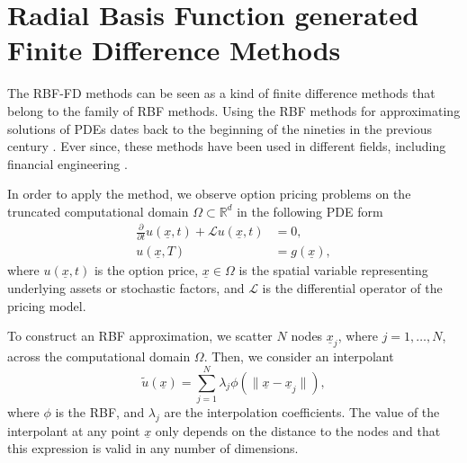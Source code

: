 \documentclass{UUThesisTemplate}
\begin{document}
\chapter{Radial Basis Function generated Finite Difference Methods}
\label{ch:rbffd}
\par The RBF-FD methods can be seen as a kind of finite difference methods that belong to the family of RBF methods. Using the RBF methods for approximating solutions of PDEs dates back to the beginning of the nineties in the previous century \cite{kansa1990multiquadrics2, kansa1990multiquadrics1}. Ever since, these methods have been used in different fields, including financial engineering \cite{pettersson2008improved, fasshauer2004using, hon1999radial}. 
\par In order to apply the method, we observe option pricing problems on the truncated computational domain $\Omega\subset \mathbb{R}^{d}$ in the following PDE form
\begin{align}
\frac{\partial}{\partial t}u(\underline{x},t) + \mathcal{L}u(\underline{x},t) &= 0, \label{eqPDE} \\
u(\underline{x},T) &= g(\underline{x}),
\end{align}
where $u(\underline{x},t)$ is the option price, $\underline{x} \in \Omega$ is the spatial variable representing underlying assets or stochastic factors, and $\mathcal{L}$ is the differential operator of the pricing model.
\par To construct an RBF approximation, we scatter $N$ nodes $\underline{x}_j$, where $j=1,\ldots,N$, across the computational domain $\Omega$. Then, we consider an interpolant
\begin{equation}
\label{eq:RBFint}
	\tilde{u}(\underline{x}) = \sum_{j=1}^N \lambda_j \phi(\|\underline{x}-\underline{x}_j\|),
\end{equation}
where $\phi$ is the RBF, and $\lambda_j$ are the interpolation coefficients. The value of the interpolant at any point $\underline{x}$ only depends on the distance to the nodes and that this expression is valid in any number of dimensions. 
\end{document}
